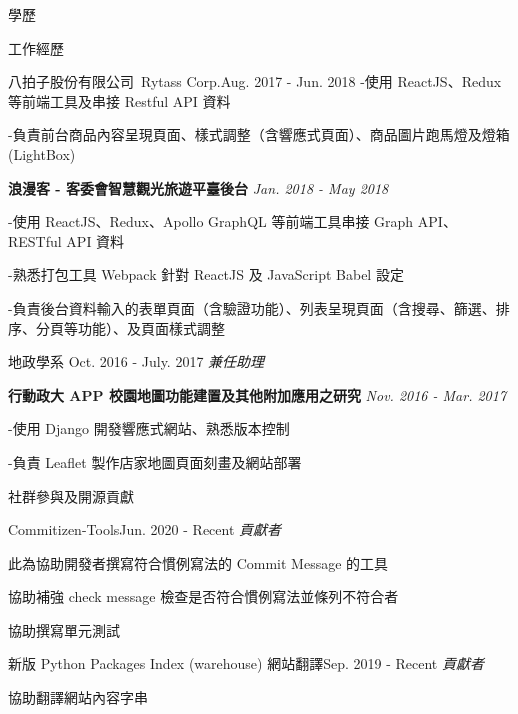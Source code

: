 \documentclass{resume} %
\begin{document}
\begin{rSection}{\Large 學歷}
\begin{rSection}{\Large 工作經歷}
\begin{rSubsection}{\large 八拍子股份有限公司\ Rytass Corp.}{Aug. 2017 - Jun. 2018}
{\quad \small -使用 ReactJS、Redux 等前端工具及串接 Restful API 資料}

{\quad \small -負責前台商品內容呈現頁面、樣式調整（含響應式頁面）、商品圖片跑馬燈及燈箱(LightBox)}

\medskip

\item {\bf 浪漫客 - 客委會智慧觀光旅遊平臺後台} {\it  Jan. 2018 - May 2018}

{\quad \small -使用 ReactJS、Redux、Apollo GraphQL 等前端工具串接 Graph API、 RESTful API 資料}

{\quad \small -熟悉打包工具 Webpack 針對 ReactJS 及 JavaScript Babel 設定}

{\quad \small -負責後台資料輸入的表單頁面（含驗證功能）、列表呈現頁面（含搜尋、篩選、排序、分頁等功能）、及頁面樣式調整}
\end{rSubsection} 

\bigskip
\bigskip
\bigskip
\bigskip


\begin{rSubsection}{\large 地政學系 }{Oct. 2016 - July. 2017} 
{\it{兼任助理}}{}
\item \rm {\bf 行動政大 APP 校園地圖功能建置及其他附加應用之研究} {\it  Nov. 2016 - Mar. 2017}

{\quad \small -使用 Django 開發響應式網站、熟悉版本控制}

{\quad \small -負責 Leaflet 製作店家地圖頁面刻畫及網站部署}


\end{rSubsection} 
\end{rSection}

\begin{rSection}{\Large 社群參與及開源貢獻}

\begin{rSubsection}{\large Commitizen-Tools}{Jun. 2020 - Recent}
{\it{貢獻者}}{}
\item \rm 此為協助開發者撰寫符合慣例寫法的 Commit Message 的工具
\item \rm 協助補強 check  message 檢查是否符合慣例寫法並條列不符合者
\item \rm 協助撰寫單元測試
\smallskip
\end{rSubsection}

\begin{rSubsection}{\large 新版 Python Packages Index (warehouse) 網站翻譯}{Sep. 2019 - Recent}
{\it{貢獻者}}{}
\item \rm 協助翻譯網站內容字串
\smallskip
\end{rSubsection}


\end{rSection}
\end{rSection}
\end{document}
